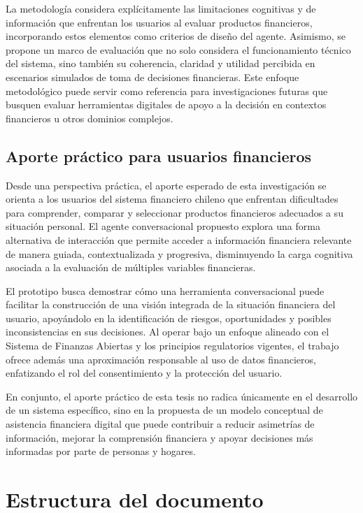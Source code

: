 \documentclass[
	spanish, %
	letterpaper, oneside
]{book}
\begin{document}
La metodología considera explícitamente las limitaciones cognitivas y de información que enfrentan los usuarios al evaluar productos financieros, incorporando estos elementos como criterios de diseño del agente. Asimismo, se propone un marco de evaluación que no solo considera el funcionamiento técnico del sistema, sino también su coherencia, claridad y utilidad percibida en escenarios simulados de toma de decisiones financieras. Este enfoque metodológico puede servir como referencia para investigaciones futuras que busquen evaluar herramientas digitales de apoyo a la decisión en contextos financieros u otros dominios complejos.

\subsection{Aporte práctico para usuarios financieros}

Desde una perspectiva práctica, el aporte esperado de esta investigación se orienta a los usuarios del sistema financiero chileno que enfrentan dificultades para comprender, comparar y seleccionar productos financieros adecuados a su situación personal. El agente conversacional propuesto explora una forma alternativa de interacción que permite acceder a información financiera relevante de manera guiada, contextualizada y progresiva, disminuyendo la carga cognitiva asociada a la evaluación de múltiples variables financieras.

El prototipo busca demostrar cómo una herramienta conversacional puede facilitar la construcción de una visión integrada de la situación financiera del usuario, apoyándolo en la identificación de riesgos, oportunidades y posibles inconsistencias en sus decisiones. Al operar bajo un enfoque alineado con el Sistema de Finanzas Abiertas y los principios regulatorios vigentes, el trabajo ofrece además una aproximación responsable al uso de datos financieros, enfatizando el rol del consentimiento y la protección del usuario.

En conjunto, el aporte práctico de esta tesis no radica únicamente en el desarrollo de un sistema específico, sino en la propuesta de un modelo conceptual de asistencia financiera digital que puede contribuir a reducir asimetrías de información, mejorar la comprensión financiera y apoyar decisiones más informadas por parte de personas y hogares.

\section{Estructura del documento}
\end{document}
